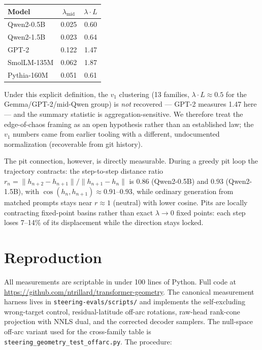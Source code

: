 \documentclass{article}
\begin{document}
\begin{center}
\begin{tabular}{lcc}
\toprule
Model & $\lambda_{\mathrm{mid}}$ & $\lambda \cdot L$ \\
\midrule
Qwen2-0.5B & 0.025 & 0.60 \\
Qwen2-1.5B & 0.023 & 0.64 \\
GPT-2 & 0.122 & 1.47 \\
SmolLM-135M & 0.062 & 1.87 \\
Pythia-160M & 0.051 & 0.61 \\
\bottomrule
\end{tabular}
\end{center}

Under this explicit definition, the $v_1$ clustering (13 families,
$\lambda \cdot L \approx 0.5$ for the Gemma/GPT-2/mid-Qwen group) is
\emph{not} recovered --- GPT-2 measures 1.47 here --- and the summary
statistic is aggregation-sensitive. We therefore treat the edge-of-chaos
framing as an open hypothesis rather than an established law; the $v_1$
numbers came from earlier tooling with a different, undocumented
normalization (recoverable from git history).

The pit connection, however, is directly measurable. During a greedy pit
loop the trajectory contracts: the step-to-step distance ratio $r_n =
\|h_{n+2}-h_{n+1}\| / \|h_{n+1}-h_n\|$ is $0.86$ (Qwen2-0.5B) and $0.93$
(Qwen2-1.5B), with $\cos(h_n, h_{n+1}) \approx 0.91$--$0.93$, while ordinary
generation from matched prompts stays near $r \approx 1$ (neutral) with
lower cosine. Pits are locally contracting fixed-point basins rather than
exact $\lambda \to 0$ fixed points: each step loses 7--14\% of its
displacement while the direction stays locked.

\section{Reproduction}

All measurements are scriptable in under 100 lines of Python. Full code at
\url{https://github.com/ntrillard/transformer-geometry}. The canonical
measurement harness lives in \texttt{steering-evals/scripts/} and implements
the self-excluding wrong-target control, residual-latitude off-arc rotations,
raw-head rank-cone projection with NNLS dual, and the corrected decoder
samplers. The null-space off-arc variant used for the cross-family table is
\texttt{steering\_geometry\_test\_offarc.py}. The procedure:
\end{document}
